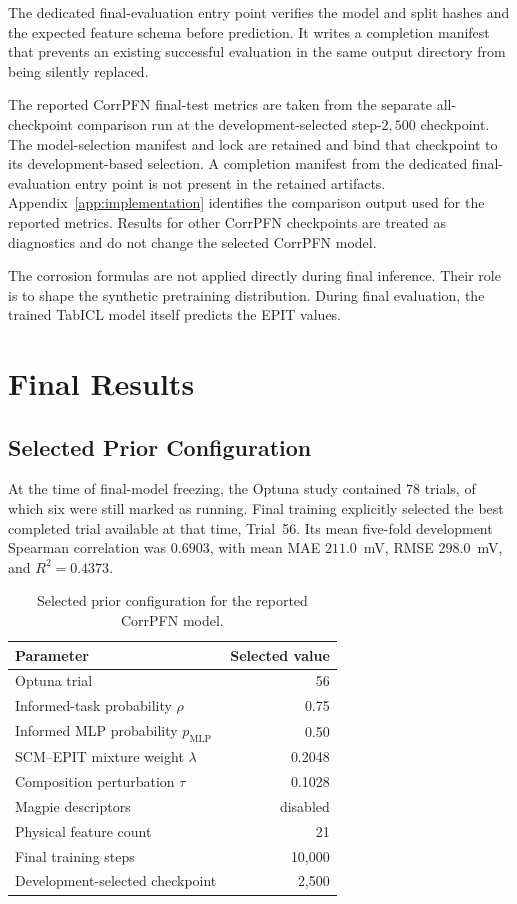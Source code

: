 \documentclass{article}
\begin{document}
The dedicated final-evaluation entry point verifies the model and split
hashes and the expected feature schema before prediction. It writes a
completion manifest that prevents an existing successful evaluation in the
same output directory from being silently replaced.

The reported CorrPFN final-test metrics are taken from the separate
all-checkpoint comparison run at the development-selected step-\(2{,}500\)
checkpoint. The model-selection manifest and lock are retained and bind
that checkpoint to its development-based selection. A completion manifest from the dedicated
final-evaluation entry point is not present in the retained artifacts.
Appendix~\ref{app:implementation} identifies the comparison output used for
the reported metrics. Results for other CorrPFN checkpoints are treated as
diagnostics and do not change the selected CorrPFN model.

The corrosion formulas are not applied directly during final inference.
Their role is to shape the synthetic pretraining distribution. During final
evaluation, the trained TabICL model itself predicts the EPIT values.

\section{Final Results}
\label{sec:results}

\subsection{Selected Prior Configuration}

At the time of final-model freezing, the Optuna study contained \(78\)
trials, of which six were still marked as running. Final training explicitly
selected the best completed trial available at that time, Trial~56. Its mean
five-fold development Spearman correlation was \(0.6903\), with mean MAE
\(211.0\)~mV, RMSE \(298.0\)~mV, and \(R^2=0.4373\).

\begin{table}[htbp]
\centering
\caption{Selected prior configuration for the reported CorrPFN model.}
\label{tab:selected-configuration}
\begin{tabular}{lr}
\toprule
Parameter & Selected value \\
\midrule
Optuna trial & 56 \\
Informed-task probability \(\rho\) & 0.75 \\
Informed MLP probability \(p_{\mathrm{MLP}}\) & 0.50 \\
SCM--EPIT mixture weight \(\lambda\) & 0.2048 \\
Composition perturbation \(\tau\) & 0.1028 \\
Magpie descriptors & disabled \\
Physical feature count & 21 \\
Final training steps & 10,000 \\
Development-selected checkpoint & 2,500 \\
\bottomrule
\end{tabular}
\end{table}
\end{document}
